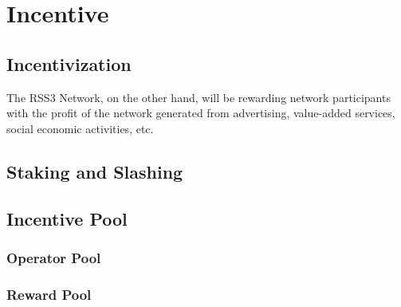 \section{Incentive}

\subsection{Incentivization}

The RSS3 Network, on the other hand, will be rewarding network participants with the profit of the network generated from advertising, value-added services, social economic activities, etc.

\subsection{Staking and Slashing}

\subsection{Incentive Pool}

\subsubsection{Operator Pool}

\subsubsection{Reward Pool}
